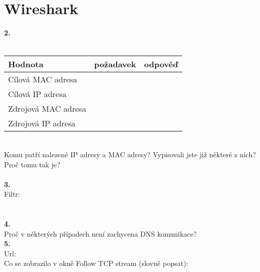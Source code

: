 \section{Wireshark}
\textbf{2.}\\
\\
\begin{tabular}{|l|c|c|}
\hline
\textbf{Hodnota} & \textbf{požadavek} & \textbf{odpověď}\\
\hline
Cílová MAC adresa & \hspace{10em} & \hspace{10em} \\
\hline
Cílová IP adresa & & \\
\hline
Zdrojová MAC adresa & & \\
\hline
Zdrojová IP adresa & & \\
\hline
\end{tabular}
\vspace{2em}
\\
Komu patří nalezené IP adresy a MAC adresy? Vypisovali jste již některé z nich? Proč tomu tak je?
\\
\vspace{6em} \\
\textbf{3.}\\
Filtr:\\
\\
\vspace{2em} \\
\textbf{4.}\\
\vspace{4em}
Proč v některých případech není zachycena DNS komunikace?\\
\textbf{5.}\\
Url:\\
Co se zobrazilo v okně Follow TCP stream (slovně popsat):\\
